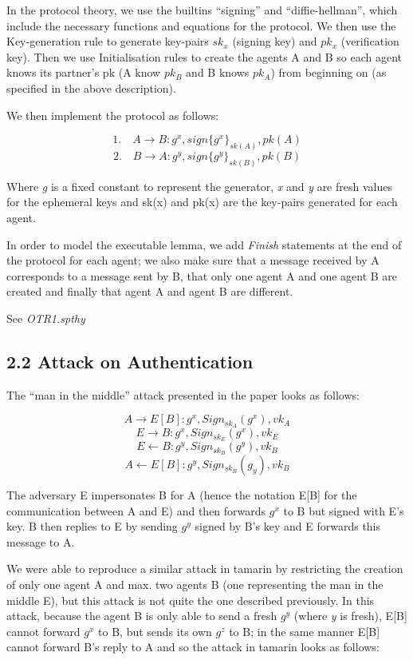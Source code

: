 \documentclass[
]{article}
\begin{document}
In the protocol theory, we use the builtins ``signing'' and
``diffie-hellman'', which include the necessary functions and equations for the protocol. We then use the Key-generation rule to generate key-pairs $sk_x$ (signing key) and $pk_x$ (verification key). Then we use Initialisation rules to create the agents A and B so each agent knows its partner's pk (A know $pk_B$ and B knows $pk_A$) from beginning on (as specified in the above description).

We then implement the protocol as follows:

\[ \text{1.} \quad A \rightarrow B: g^x, sign\{g^x\}_{sk(A)}, pk(A) \]
\[ \text{2.} \quad B \rightarrow A: g^y, sign\{g^y\}_{sk(B)}, pk(B) \]

Where \emph{g} is a fixed constant to represent the generator,
\emph{x} and \emph{y} are fresh values for the ephemeral keys and
sk(x) and pk(x) are the key-pairs generated for each agent.

In order to model the executable lemma, we add \emph{Finish} statements at the end of the protocol for each agent; we also make sure that a message received by A corresponds to a message sent by B, that only one agent A and one agent B are created and finally that agent A and agent B are different.

See \emph{OTR1.spthy}

\newpage
\hypertarget{attack-on-authentication}{%
\subsection{2.2 Attack on Authentication}\label{attack-on-authentication}}

The ``man in the middle'' attack presented in the paper looks as follows:

\[ A \rightarrow E[B] : g^x, Sign_{sk_A} (g^x), vk_A \]
\[ E \rightarrow B : g^x, Sign_{sk_E} (g^x), vk_E \]
\[ E \leftarrow B : g^y, Sign_{sk_B} (g^y), vk_B \]
\[ A \leftarrow E[B] : g^y, Sign_{sk_B} (g_y), vk_B \]

The adversary E impersonates B for A (hence the notation E[B] for the communication between A and E) and then forwards $g^x$ to B but signed with E's key. B then replies to E by sending $g^y$ signed by B's key and E forwards this message to A.

We were able to reproduce a similar attack in tamarin by restricting the creation of only one agent A and  max. two agents B (one representing the man in the middle E), but this attack is not quite the one described previously. In this attack, because the agent B is only able to send a fresh $g^y$ (where \emph{y} is fresh), E[B] cannot forward $g^x$ to B, but sends its own $g^z$ to B; in the same manner E[B] cannot forward B's reply to A and so the attack in tamarin looks as follows:
\end{document}
